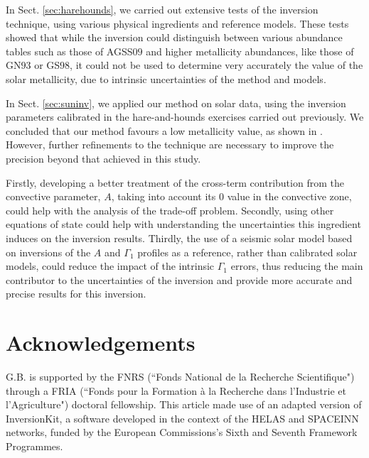 \documentclass[a4paper,fleqn,usenatbib]{mnras}
\begin{document}
In Sect. \ref{sec:harehounds}, we carried out extensive tests of the inversion technique, using various physical ingredients and reference models. These tests showed that while the inversion could distinguish between various abundance tables such as those of AGSS$09$ and higher metallicity abundances, like those of GN$93$ or GS$98$, it could not be used to determine very accurately the value of the solar metallicity, due to intrinsic uncertainties of the method and models. 

In Sect. \ref{sec:suninv}, we applied our method on solar data, using the inversion parameters calibrated in the hare-and-hounds exercises carried out previously. We concluded that our method favours a low metallicity value, as shown in \citet{Vorontsov}. However, further refinements to the technique are necessary to improve the precision beyond that achieved in this study.

Firstly, developing a better treatment of the cross-term contribution from the convective parameter, $A$, taking into account its $0$ value in the convective zone, could help with the analysis of the trade-off problem. Secondly, using other equations of state could help with understanding the uncertainties this ingredient induces on the inversion results. Thirdly, the use of a seismic solar model based on inversions of the $A$ and $\Gamma_{1}$ profiles as a reference, rather than calibrated solar models, could reduce the impact of the intrinsic $\Gamma_{1}$ errors, thus reducing the main contributor to the uncertainties of the inversion and provide more accurate and precise results for this inversion.  

\section*{Acknowledgements}

G.B. is supported by the FNRS (``Fonds National de la Recherche Scientifique") through a FRIA (``Fonds pour la Formation \`a la Recherche dans l'Industrie et l'Agriculture") doctoral fellowship. This article made use of an adapted version of InversionKit, a software developed in the context of the HELAS and SPACEINN networks, funded by the European Commissions's Sixth and Seventh Framework Programmes.






\bsp	%
\label{lastpage}
\end{document}
